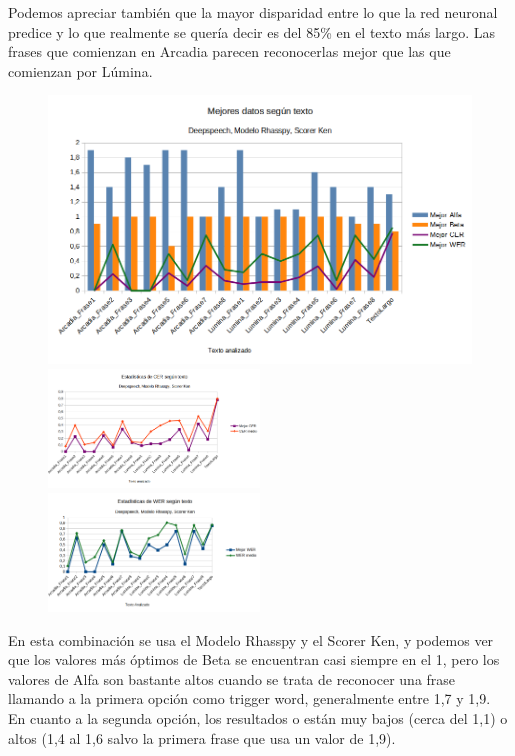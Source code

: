 Podemos apreciar también que la mayor disparidad entre lo que la red neuronal predice y lo que realmente se quería decir es del 85\% en el texto más largo. Las frases que comienzan en Arcadia parecen reconocerlas mejor que las que comienzan por Lúmina.

\begin{figure}[H]
	\includegraphics[width=\textwidth]{imagenes/MejoresResultados_DeepSpeechIvanKenRhasspy.png} \\
	\includegraphics[width=0.5\textwidth]{imagenes/CER_DeepSpeechIvanKenRhasspy.png} \hfill \includegraphics[width=0.5\textwidth]{imagenes/WER_DeepspeechIvanKenRhasspy.png}
\end{figure}

En esta combinación se usa el Modelo Rhasspy y el Scorer Ken, y podemos ver que los valores más óptimos de Beta se encuentran casi siempre en el 1, pero los valores de Alfa son bastante altos cuando se trata de reconocer una frase llamando a la primera opción como trigger word, generalmente entre 1,7 y 1,9. En cuanto a la segunda opción, los resultados o están muy bajos (cerca del 1,1) o altos (1,4 al 1,6 salvo la primera frase que usa un valor de 1,9).

